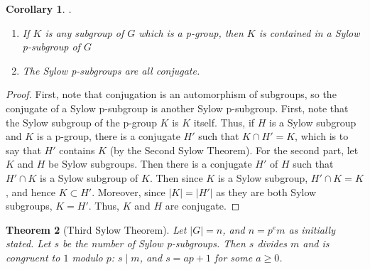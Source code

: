 \documentclass[12pt]{article}
\newtheorem{thm}{Theorem}[section]
\newtheorem{cor}[thm]{Corollary}
\theoremstyle{definition}
\theoremstyle{remark}
\numberwithin{equation}{section}
\begin{document}
\begin{cor}
        .\newline \begin{enumerate}
                \item If $K$ is any subgroup of $G$ which is a p-group, then $K$ is contained in a Sylow p-subgroup of $G$
                \item The Sylow p-subgroups are all conjugate.
        \end{enumerate}
\end{cor}
\begin{proof}
        First, note that conjugation is an automorphism of subgroups, so the conjugate of a Sylow p-subgroup is another Sylow p-subgroup. First, note that the Sylow subgroup of the p-group $K$ is $K$ itself. Thus, if $H$ is a Sylow subgroup and $K$ is a p-group, there is a conjugate $H'$ such that $K\cap H' = K$, which is to say that $H'$ contains $K$ (by the Second Sylow Theorem). For the second part, let $K$ and $H$ be Sylow subgroups. Then there is a conjugate $H'$ of $H$ such that $H' \cap K$ is a Sylow subgroup of $K$. Then since $K$ is a Sylow subgroup, $H' \cap K = K$, and hence $K \subset H'$. Moreover, since $|K| = |H'|$ as they are both Sylow subgroups, $K = H'$. Thus, $K$ and $H$ are conjugate.
\end{proof}

\vspace{15pt}

\begin{thm}[Third Sylow Theorem]
         Let $|G| = n$, and $n = p^em$ as initially stated. Let $s$ be the number of Sylow p-subgroups. Then $s$ divides $m$ and is congruent to $1$ modulo $p$: $s\;\vert\;m$, and $s = ap + 1$ for some $a \geq 0$.
\end{thm}


\vspace{15pt}
\end{document}
